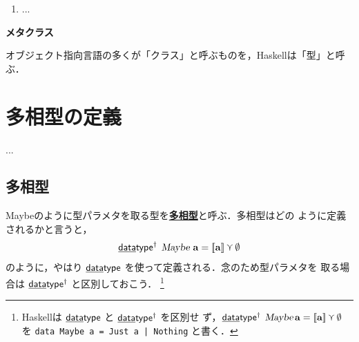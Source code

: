 \documentclass[a5paper,twoside,fleqn,draft]{jsbook}
\def\[{[\![}
\def\]{]\!]}
\newcommand{\programminglanguage}[1]{\textsf{#1}}
\newcommand{\haskell}{\programminglanguage{Haskell}}
\newenvironment{note}[1]{\begin{boxnote}\begin{center}\textbf{#1}\end{center}}{\end{boxnote}}
\newcommand{\keyword}[1]{{\underline{\textbf{#1}}}}
\newcommand{\code}[1]{\texttt{#1}}
\newcommand{\mKeyword}[1]{\mathsf{#1}}
\newcommand{\mKeywordUnderline}[1]{\text{\underline{\textsf{#1}}}}
\newcommand{\mDataTypeKeyword}{\mKeywordUnderline{data}\mKeyword{type}}
\DeclareMathOperator{\mDataType}{\mDataTypeKeyword}
\DeclareMathOperator{\mDataTypePolymorphic}{\mDataTypeKeyword^\dagger}
\newcommand{\mNothing}{\emptyset}
\DeclareMathOperator{\mValueOr}{\curlyvee}
\newcommand{\mType}[1]{\mathbf{#1}} %
\newcommand{\mA}{\mType{a}}
\newcommand{\mTypeAssemble}[2]{{}^{\mType{#1}}\[\mType{#2}\]}
\newcommand{\mMaybeType}[1]{\[\mType{#1}\]}%
\newcommand{\mTypeConstructor}[1]{\textsl{#1}}
\DeclareMathOperator{\mMaybeTypeConstructor}{\mTypeConstructor{Maybe}}
\newcommand{\mValueConstructor}[1]{\mathrm{#1}}
\newcommand{\mValueWith}[2]{{}^\mValueConstructor{#1}\[#2\]}
\newcommand{\mJustWith}[1]{\[#1\]}%
\begin{document}
\begin{enumerate}
\item ...
\end{enumerate}

\begin{note}{メタクラス}
オブジェクト指向言語の多くが「クラス」と呼ぶものを，\haskell は「型」と呼ぶ．


\end{note}


\chapter{多相型の定義}
\label{ch:polymorphic-data-type}
...

\section{多相型}

Maybeのように型パラメタを取る型を\keyword{多相型}と呼ぶ．多相型はどの
ように定義されるかと言うと，
\begin{equation}
  \mDataTypePolymorphic\;
  \mMaybeTypeConstructor\,\mA
  =\mJustWith{\mA}\mValueOr\mNothing
\end{equation}
のように，やはり $\mDataType$ を使って定義される．念のため型パラメタを
取る場合は $\mDataTypePolymorphic$ と区別しておこう．
\footnote{\haskell は $\mDataType$ と $\mDataTypePolymorphic$ を区別せ
  ず，$\mDataTypePolymorphic\;\mMaybeTypeConstructor\mA
  =\mJustWith{\mA }\mValueOr\mNothing$ を \code{data Maybe a = Just a
    | Nothing} と書く．}
\end{document}
